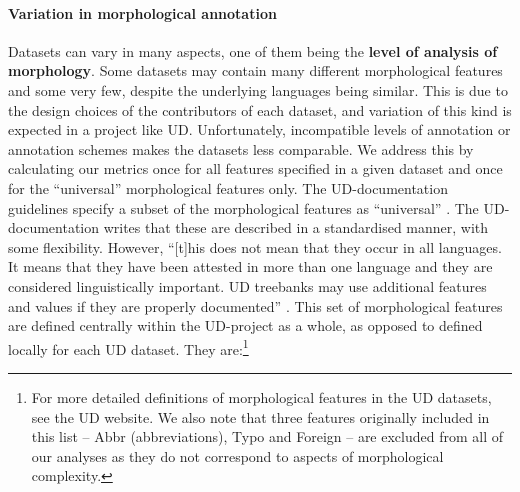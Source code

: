 \documentclass[USenglish]{article}
\begin{document}
\paragraph{Variation in morphological annotation}
Datasets can vary in many aspects, one of them being the \textbf{level of analysis of morphology}. 
Some datasets may contain many different morphological features and some very few, despite the underlying languages being similar. 
This is due to the design choices of the contributors of each dataset, and variation of this kind is expected in a project like UD.
Unfortunately, incompatible levels of annotation or annotation schemes makes the datasets less comparable.
We address this by calculating our metrics once for all features specified in a given dataset and once for the ``universal'' morphological features only. 
The UD-documentation guidelines specify a subset of the morphological features as ``universal'' \citep{ud_2_feat_website}. 
The UD-documentation writes that these are described in a standardised manner, with some flexibility. 
However, ``[t]his does not mean that they occur in all languages. It means that they have been attested in more than one language and they are considered linguistically important. UD treebanks may use additional features and values if they are properly documented'' \citep{ud_2_feat_website}. 
This set of morphological features are defined centrally within the UD-project as a whole, as opposed to defined locally for each UD dataset. 
They are:\footnote{For more detailed definitions of morphological features in the UD datasets, see the UD website. We also note that three features originally included in this list -- Abbr (abbreviations), Typo and Foreign -- are excluded from all of our analyses as they do not correspond to aspects of morphological complexity.}
\end{document}
